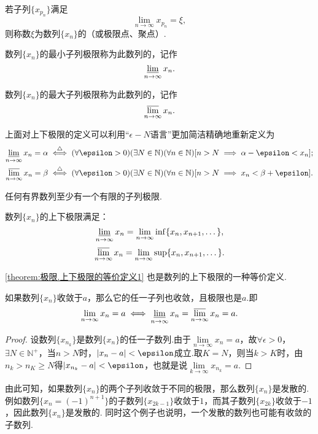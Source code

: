 \begin{definition}
若子列\(\{x_{p_n}\}\)满足\[
\lim\limits_{n\to\infty} x_{p_n} = \xi,
\]则称数\(\xi\)为数列\(\{x_n\}\)的（或极限点、聚点）.

数列\(\{x_n\}\)的最小子列极限称为此数列的，记作\[
\varliminf\limits_{n\to\infty} x_n.
\]

数列\(\{x_n\}\)的最大子列极限称为此数列的，记作\[
\varlimsup\limits_{n\to\infty} x_n.
\]
\end{definition}
上面对上下极限的定义可以利用“\(\epsilon-N\)语言”更加简洁精确地重新定义为\begin{align*}
	\varliminf\limits_{n\to\infty} x_n = \alpha
	&\defiff
	(\forall\epsilon>0)
	(\exists N\in\mathbb{N})
	(\forall n\in\mathbb{N})
	[
		n>N
		\implies
		\alpha-\epsilon < x_n
	]; \\
	\varlimsup\limits_{n\to\infty} x_n = \beta
	&\defiff
	(\forall\epsilon>0)
	(\exists N\in\mathbb{N})
	(\forall n\in\mathbb{N})
	[
		n>N
		\implies
		x_n < \beta+\epsilon
	].
\end{align*}

\begin{theorem}\label{theorem:极限.波尔查诺--魏尔斯特拉斯原理}
任何有界数列至少有一个有限的子列极限.
\end{theorem}

\begin{theorem}\label{theorem:极限.上下极限的等价定义1}
数列\(\{x_n\}\)的上下极限满足：\[
	\varliminf\limits_{n\to\infty} x_n = \lim\limits_{n\to\infty} \inf\{x_n,x_{n+1},\dotsc\},
\]\[
	\varlimsup\limits_{n\to\infty} x_n = \lim\limits_{n\to\infty} \sup\{x_n,x_{n+1},\dotsc\}.
\]
\end{theorem}
\cref{theorem:极限.上下极限的等价定义1}
也是数列的上下极限的一种等价定义.

\begin{theorem}[收敛数列与其子列的关系]
如果数列\(\{x_n\}\)收敛于\(a\)，那么它的任一子列也收敛，且极限也是\(a\).即\[
\lim\limits_{n\to\infty} x_n = a
\iff
\varliminf\limits_{n\to\infty} x_n = \varlimsup\limits_{n\to\infty} x_n = a.
\]
\begin{proof}
设数列\(\{x_{n_k}\}\)是数列\(\{x_n\}\)的任一子数列.由于\(\lim\limits_{n\to\infty}x_n = a\)，故\(\forall \epsilon > 0\)，\(\exists N \in \mathbb{N}^+\)，当\(n > N\)时，\(\abs{x_n - a} < \epsilon\)成立.取\(K = N\)，则当\(k > K\)时，由\(n_k > n_K \geq N\)得\(\abs{x_{n_k} - a} < \epsilon\)，也就是说\(\lim\limits_{k\to\infty}x_{n_k} = a\).
\end{proof}
\end{theorem}
由此可知，如果数列\(\{x_n\}\)的两个子列收敛于不同的极限，那么数列\(\{x_n\}\)是发散的.
例如数列\(\{x_n=(-1)^{n+1}\}\)的子数列\(\{x_{2k-1}\}\)收敛于\(1\)，而其子数列\(\{x_{2k}\}\)收敛于\(-1\)，因此数列\(\{x_n\}\)是发散的.
同时这个例子也说明，一个发散的数列也可能有收敛的子数列.

